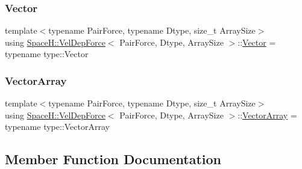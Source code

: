 \mbox{\label{struct_space_h_1_1_vel_dep_force_a229c41eb710a16ec67978bb98c532622}} 
\subsubsection{\texorpdfstring{Vector}{Vector}}
{\footnotesize\ttfamily template$<$typename Pair\+Force, typename Dtype, size\+\_\+t Array\+Size$>$ \\
using \mbox{\hyperlink{struct_space_h_1_1_vel_dep_force}{Space\+H\+::\+Vel\+Dep\+Force}}$<$ Pair\+Force, Dtype, Array\+Size $>$\+::\mbox{\hyperlink{struct_space_h_1_1_vel_dep_force_a229c41eb710a16ec67978bb98c532622}{Vector}} =  typename type\+::\+Vector}

\mbox{\label{struct_space_h_1_1_vel_dep_force_ad2d0301ffff67a74018b92c17a3475de}} 
\subsubsection{\texorpdfstring{Vector\+Array}{VectorArray}}
{\footnotesize\ttfamily template$<$typename Pair\+Force, typename Dtype, size\+\_\+t Array\+Size$>$ \\
using \mbox{\hyperlink{struct_space_h_1_1_vel_dep_force}{Space\+H\+::\+Vel\+Dep\+Force}}$<$ Pair\+Force, Dtype, Array\+Size $>$\+::\mbox{\hyperlink{struct_space_h_1_1_vel_dep_force_ad2d0301ffff67a74018b92c17a3475de}{Vector\+Array}} =  typename type\+::\+Vector\+Array}



\subsection{Member Function Documentation}
\mbox{\label{struct_space_h_1_1_vel_dep_force_af317008a8a1371f2a36f9b44835343f2}} 
